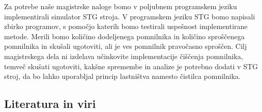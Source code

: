 \documentclass[a4paper, 12pt]{article}
\begin{document}

Za potrebe naše magistrske naloge bomo v poljubnem programskem jeziku implementirali simulator STG stroja. V programskem jeziku STG bomo napisali zbirko programov, s pomočjo katerih bomo testirali uspešnost implementirane metode. Merili bomo količino dodeljenega pomnilnika in količino sproščenega pomnilnika in skušali ugotoviti, ali je ves pomnilnik pravočasno sproščen. Cilj magistrskega dela ni izdelava učinkovite implementacije čiščenja pomnilnika, temveč skušati ugotoviti, kakšne spremembe in analize je potrebno dodati v STG stroj, da bo lahko uporabljal princip lastništva namesto čistilca pomnilnika.   

\subsection{Literatura in viri}
\label{literatura}

\renewcommand\refname{}
\vspace{-50px}
\printbibliography[heading=bibintoc,title={}]

% 
\end{document}
